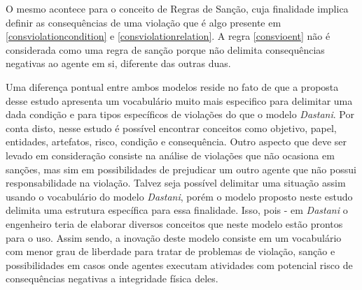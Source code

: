O mesmo acontece para o conceito de Regras de Sanção, cuja finalidade implica definir as consequências de uma violação que é algo presente em \ref{consviolationcondition} e \ref{consviolationrelation}. A regra \ref{consvioent} não é considerada como uma regra de sanção porque não delimita consequências negativas ao agente em si, diferente das outras duas. 

Uma diferença pontual entre ambos modelos reside no fato de que a proposta desse estudo apresenta um vocabulário muito mais especifico para delimitar uma dada condição e para tipos específicos de violações do que o modelo \textit{Dastani}. Por conta disto, nesse estudo é possível encontrar conceitos como objetivo, papel, entidades, artefatos, risco, condição e consequência. Outro aspecto que deve ser levado em consideração consiste na análise de violações que não ocasiona em sanções, mas sim em possibilidades de prejudicar um outro agente que não possui responsabilidade na violação. Talvez seja possível delimitar uma situação assim usando o vocabulário do modelo \textit{Dastani}, porém o modelo proposto neste estudo delimita uma estrutura específica para essa finalidade. Isso, pois - em \textit{Dastani} o engenheiro teria de elaborar diversos conceitos que neste modelo estão prontos para o uso. Assim sendo, a inovação deste modelo consiste em um vocabulário com menor grau de liberdade para tratar de problemas de violação, sanção 
e possibilidades em casos onde agentes executam atividades com potencial risco de consequências negativas a integridade física deles. 